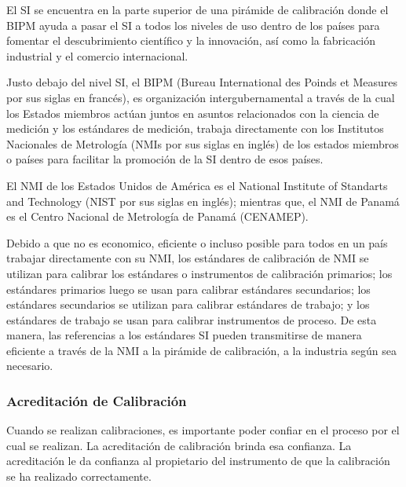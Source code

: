 \par 
El SI se encuentra en la parte superior de una pirámide de calibración donde el BIPM ayuda a pasar el SI a todos los niveles de uso dentro de los países para fomentar el descubrimiento científico y la innovación, así como la fabricación industrial y el comercio internacional.

\par \noindent 
Justo debajo del nivel SI, el BIPM (Bureau International des Poinds et Measures por sus siglas en francés), es organización intergubernamental a través de la cual los Estados miembros actúan juntos
en asuntos relacionados con la ciencia de medición y los estándares de medición, trabaja directamente con los Institutos Nacionales de Metrología (NMIs por sus siglas en inglés) de los estados miembros o países para facilitar la promoción de la SI dentro de esos países.

\par \noindent
El NMI de los Estados Unidos de América es el National Institute of Standarts and Technology (NIST por sus siglas en inglés); mientras que, el NMI de Panamá es el Centro Nacional de Metrología de Panamá (CENAMEP).

\par \noindent
Debido a que no es economico, eficiente o incluso posible para todos en un país trabajar directamente con su NMI, los estándares de calibración de NMI se utilizan para calibrar los estándares o instrumentos de calibración primarios; los estándares primarios luego se usan para calibrar estándares secundarios; los estándares secundarios se utilizan para calibrar estándares de trabajo; y los estándares de trabajo se usan para calibrar instrumentos de proceso. De esta manera, las referencias a los estándares SI pueden transmitirse de manera eficiente a través de la NMI a la pirámide de calibración, a la industria según sea necesario.

\subsubsection{Acreditación de Calibración \cite{calibracion-fluke}}

\par 
Cuando se realizan calibraciones, es importante poder confiar en el proceso por el cual se realizan. La acreditación de calibración brinda esa confianza. La acreditación le da confianza al propietario del instrumento de que la calibración se ha realizado correctamente.

